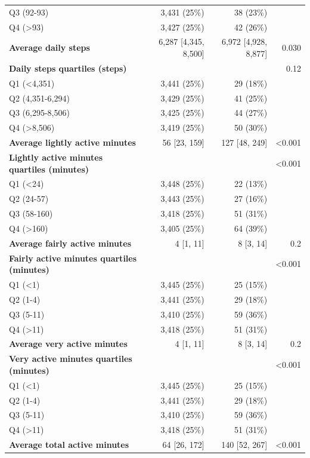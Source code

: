 \documentclass[11pt]{article}
\begin{document}
\begin{longtable}{@{}p{6.4cm}rrr@{}}
\quad Q3 (92-93) & 3,431 (25\%) & 38 (23\%) &  \\
\quad Q4 (>93) & 3,427 (25\%) & 42 (26\%) &  \\
\textbf{Average daily steps} & 6,287 [4,345, 8,500] & 6,972 [4,928, 8,877] & 0.030 \\
\textbf{Daily steps quartiles (steps)} &  &  & 0.12 \\
\quad Q1 (<4,351) & 3,441 (25\%) & 29 (18\%) &  \\
\quad Q2 (4,351-6,294) & 3,429 (25\%) & 41 (25\%) &  \\
\quad Q3 (6,295-8,506) & 3,425 (25\%) & 44 (27\%) &  \\
\quad Q4 (>8,506) & 3,419 (25\%) & 50 (30\%) &  \\
\textbf{Average lightly active minutes} & 56 [23, 159] & 127 [48, 249] & <0.001 \\
\textbf{Lightly active minutes quartiles (minutes)} &  &  & <0.001 \\
\quad Q1 (<24) & 3,448 (25\%) & 22 (13\%) &  \\
\quad Q2 (24-57) & 3,443 (25\%) & 27 (16\%) &  \\
\quad Q3 (58-160) & 3,418 (25\%) & 51 (31\%) &  \\
\quad Q4 (>160) & 3,405 (25\%) & 64 (39\%) &  \\
\textbf{Average fairly active minutes} & 4 [1, 11] & 8 [3, 14] & 0.2 \\
\textbf{Fairly active minutes quartiles (minutes)} &  &  & <0.001 \\
\quad Q1 (<1) & 3,445 (25\%) & 25 (15\%) &  \\
\quad Q2 (1-4) & 3,441 (25\%) & 29 (18\%) &  \\
\quad Q3 (5-11) & 3,410 (25\%) & 59 (36\%) &  \\
\quad Q4 (>11) & 3,418 (25\%) & 51 (31\%) &  \\
\textbf{Average very active minutes} & 4 [1, 11] & 8 [3, 14] & 0.2 \\
\textbf{Very active minutes quartiles (minutes)} &  &  & <0.001 \\
\quad Q1 (<1) & 3,445 (25\%) & 25 (15\%) &  \\
\quad Q2 (1-4) & 3,441 (25\%) & 29 (18\%) &  \\
\quad Q3 (5-11) & 3,410 (25\%) & 59 (36\%) &  \\
\quad Q4 (>11) & 3,418 (25\%) & 51 (31\%) &  \\
\textbf{Average total active minutes} & 64 [26, 172] & 140 [52, 267] & <0.001 \\

\end{longtable}
\end{document}
